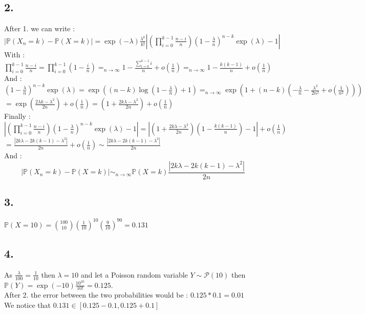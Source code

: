\documentclass{article}
\begin{document}
\subsection*{2.}
After 1. we can write : $|\mathbb{P}(X_n = k)-\mathbb{P}(X=k)| = \exp(-\lambda)\frac{\lambda^k}{k!}\left|\left(\prod_{i=0}^{k-1}\frac{n-i}{n}\right)(1-\frac{\lambda}{n})^{n-k}\exp(\lambda) - 1\right|$
\\
With : $\prod_{i=0}^{k-1}\frac{n-i}{n} = \prod_{i=0}^{k-1} (1-\frac{i}{n}) =_{n\to \infty} 1 - \frac{\sum_{i=0}^{k-1} i}{n} +o(\frac{1}{n}) =_{n\to \infty} 1 - \frac{k(k-1)}{n} + o(\frac{1}{n})$
\\
And : $\left(1-\frac{\lambda}{n}\right)^{n-k}\exp(\lambda) = \exp((n-k)\log(1-\frac{\lambda}{n})+1) =_{n\to\infty} \exp(1+(n-k)(-\frac{\lambda}{n}-\frac{\lambda^2}{2n^2} + o(\frac{1}{n^2})))$
\\
$= \exp(\frac{2\lambda k-\lambda^2}{2n})+o(\frac{1}{n}) = (1+\frac{2k\lambda-\lambda^2}{2n}) + o(\frac{1}{n})$
\\
Finally : $|\left(\prod_{i=0}^{k-1}\frac{n-i}{n}\right)\left(1-\frac{\lambda}{n}\right)^{n-k}\exp(\lambda) -1| = |\left(1+\frac{2k\lambda-\lambda^2}{2n}\right)\left(1 - \frac{k(k-1)}{n}\right) -1| + o(\frac{1}{n})$
\\
$= \frac{|2k\lambda-2k(k-1)-\lambda^2|}{2n}+o(\frac{1}{n})\sim\frac{|2k\lambda-2k(k-1)-\lambda^2|}{2n}$
\\
And : $$\boxed{|\mathbb{P}(X_n=k)-\mathbb{P}(X=k)|\sim_{n\to\infty}\mathbb{P}(X=k)\frac{|2k\lambda-2k(k-1)-\lambda^2|}{2n}}$$
\newpage
\subsection*{3.}
$\mathbb{P}(X=10) = \binom{100}{10}\left(\frac{1}{10}\right)^{10}\left(\frac{9}{10}\right)^{90} = 0.131$
\subsection*{4.}
As $\frac{\lambda}{100} = \frac{1}{10}$ then $\lambda = 10$ and let a Poisson random variable $Y\sim\mathcal{P}(10)$ then $\mathbb{P}(Y) = \exp(-10)\frac{10^10}{10!} = 0.125$.\\
After 2. the error between the two probabilities would be : $0.125*0.1 = 0.01$
\\
We notice that $0.131\in[0.125-0.1,0.125+0.1]$
\end{document}
